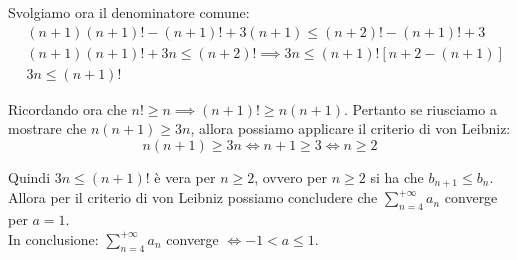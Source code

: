 \documentclass{article}
\begin{document}
\noindent Svolgiamo ora il denominatore comune:
\begin{align*}
    & (n + 1)(n + 1)! - (n + 1)! + 3(n + 1) \leq (n + 2)! - (n + 1)! + 3 \\
    & (n + 1)(n + 1)! + 3n \leq (n + 2)! \implies 3n \leq (n + 1)![n + 2 - (n + 1)]\\
    & 3n \leq (n + 1)!
\end{align*}

\noindent Ricordando ora che $n! \geq n \implies (n + 1)! \geq n(n + 1)$. Pertanto se riusciamo a mostrare che $n(n + 1) \geq 3n$, allora possiamo applicare il criterio di von Leibniz:
\begin{equation*}
    n(n + 1) \geq 3n \iff n + 1 \geq 3 \iff n \geq 2
\end{equation*}

\noindent Quindi $3n \leq (n + 1)!$ è vera per $n \geq 2$, ovvero per $n \geq 2$ si ha che $b_{n + 1} \leq b_n$. Allora per il criterio di von Leibniz possiamo concludere che $\sum_{n = 4}^{+\infty} a_n$ converge per $a = 1$.\\
In conclusione: $\sum_{n = 4}^{+\infty} a_n$ converge $\iff -1 < a \leq 1$.
\end{document}
